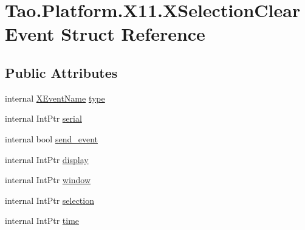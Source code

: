 \hypertarget{struct_tao_1_1_platform_1_1_x11_1_1_x_selection_clear_event}{
\section{Tao.Platform.X11.XSelectionClearEvent Struct Reference}
\label{struct_tao_1_1_platform_1_1_x11_1_1_x_selection_clear_event}
}
\subsection*{Public Attributes}
\begin{DoxyCompactItemize}
\item 
internal \hyperlink{namespace_tao_1_1_platform_1_1_x11_aff81ed5b8778e1ea8e872861dff9f146}{XEventName} \hyperlink{struct_tao_1_1_platform_1_1_x11_1_1_x_selection_clear_event_a9c2d815b92d58200ecc397a1033da40b}{type}
\item 
internal IntPtr \hyperlink{struct_tao_1_1_platform_1_1_x11_1_1_x_selection_clear_event_a7a94502562ab689728d12ceabce7e934}{serial}
\item 
internal bool \hyperlink{struct_tao_1_1_platform_1_1_x11_1_1_x_selection_clear_event_a96d037023fe0093f4c8e789ed8436dd8}{send\_\-event}
\item 
internal IntPtr \hyperlink{struct_tao_1_1_platform_1_1_x11_1_1_x_selection_clear_event_a12d8a509a9eb87f38c8e280cd0274f78}{display}
\item 
internal IntPtr \hyperlink{struct_tao_1_1_platform_1_1_x11_1_1_x_selection_clear_event_a171e3ba5de9c3f9667b9946ab523ea2a}{window}
\item 
internal IntPtr \hyperlink{struct_tao_1_1_platform_1_1_x11_1_1_x_selection_clear_event_aac480a8449bc8731a019ee759e9e9da5}{selection}
\item 
internal IntPtr \hyperlink{struct_tao_1_1_platform_1_1_x11_1_1_x_selection_clear_event_a46ac45adcdb8f78af3f01676c3c17ebe}{time}
\end{DoxyCompactItemize}


